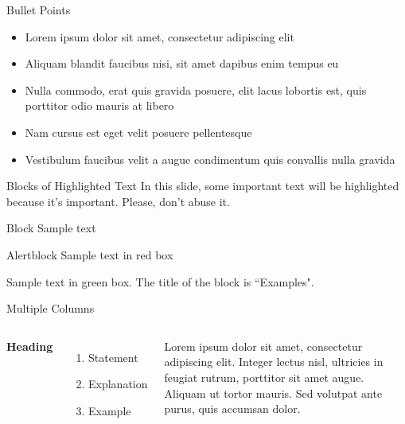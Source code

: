 \documentclass[aspectratio=169,xcolor=dvipsnames,serif]{beamer}
\begin{document}

\begin{frame}{Bullet Points}
    \begin{itemize}
        \item Lorem ipsum dolor sit amet, consectetur adipiscing elit
        \item Aliquam blandit faucibus nisi, sit amet dapibus enim tempus eu
        \item Nulla commodo, erat quis gravida posuere, elit lacus lobortis est, quis porttitor odio mauris at libero
        \item Nam cursus est eget velit posuere pellentesque
        \item Vestibulum faucibus velit a augue condimentum quis convallis nulla gravida
    \end{itemize}
\end{frame}



\begin{frame}{Blocks of Highlighted Text}
    In this slide, some important text will be \alert{highlighted} because it's important. Please, don't abuse it.

    \begin{block}{Block}
        Sample text
    \end{block}

    \begin{alertblock}{Alertblock}
        Sample text in red box
    \end{alertblock}

    \begin{examples}
        Sample text in green box. The title of the block is ``Examples".
    \end{examples}
\end{frame}


\begin{frame}{Multiple Columns}
    \begin{columns}[c] %

        \textbf{Heading}
        \begin{enumerate}
            \item Statement
            \item Explanation
            \item Example
        \end{enumerate}

        Lorem ipsum dolor sit amet, consectetur adipiscing elit. Integer lectus nisl, ultricies in feugiat rutrum, porttitor sit amet augue. Aliquam ut tortor mauris. Sed volutpat ante purus, quis accumsan dolor.

    \end{columns}
\end{frame}
\end{document}
